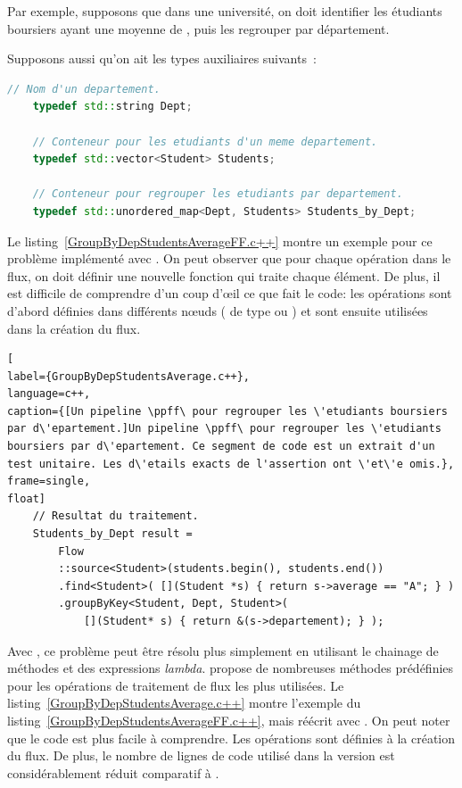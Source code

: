 Par exemple, supposons que dans une universit\'e, on doit identifier les \'etudiants boursiers ayant une moyenne de , puis les regrouper par d\'epartement.

\goodbreak
\begin{samepage}
Supposons aussi qu'on ait les types auxiliaires suivants~:
\begin{lstlisting}[language=c++]
    // Nom d'un departement.
    typedef std::string Dept;
    
    // Conteneur pour les etudiants d'un meme departement.
    typedef std::vector<Student> Students;

    // Conteneur pour regrouper les etudiants par departement.
    typedef std::unordered_map<Dept, Students> Students_by_Dept; 
\end{lstlisting}
\end{samepage}


Le listing~\ref{GroupByDepStudentsAverageFF.c++} montre un exemple pour ce problème impl\'ement\'e avec . On peut observer que pour chaque op\'eration dans le flux, on doit définir une nouvelle fonction qui traite chaque élément. De plus, il est difficile de comprendre d'un coup d'œil ce que fait le code: les op\'erations sont d'abord d\'efinies dans diff\'erents nœuds ( de type  ou ) et sont ensuite utilis\'ees dans la cr\'eation du flux. 

\begin{lstlisting}[
label={GroupByDepStudentsAverage.c++},
language=c++,
caption={[Un pipeline \ppff\ pour regrouper les \'etudiants boursiers par d\'epartement.]Un pipeline \ppff\ pour regrouper les \'etudiants boursiers par d\'epartement. Ce segment de code est un extrait d'un test unitaire. Les d\'etails exacts de l'assertion ont \'et\'e omis.},
frame=single,
float]
    // Resultat du traitement.
    Students_by_Dept result = 
        Flow
        ::source<Student>(students.begin(), students.end())
        .find<Student>( [](Student *s) { return s->average == "A"; } )
        .groupByKey<Student, Dept, Student>(
            [](Student* s) { return &(s->departement); } );        
\end{lstlisting}

Avec , ce probl\`eme peut \^etre r\'esolu plus simplement en utilisant le chainage de m\'ethodes et des expressions \emph{lambda}.  propose de nombreuses m\'ethodes pr\'ed\'efinies pour les op\'erations de traitement de flux les plus utilis\'ees. Le listing~\ref{GroupByDepStudentsAverage.c++} montre l'exemple du listing~\ref{GroupByDepStudentsAverageFF.c++}, mais r\'e\'ecrit avec . On peut noter que le code est plus facile \`a comprendre. Les op\'erations sont définies \`a la cr\'eation du flux. De plus, le nombre de lignes de code utilis\'e dans la version  est consid\'erablement r\'eduit comparatif \`a . 

